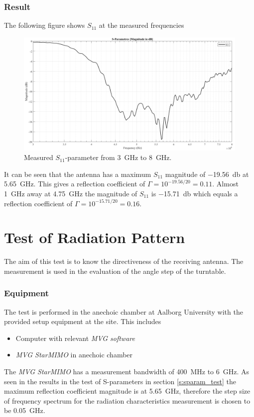 \subsubsection{Result}
The following figure shows $S_{11}$ at the measured frequencies
\begin{figure}[H]
    \centering
    \includegraphics[width=1\textwidth]{figures/s11_meas.png}
    \caption{Measured $S_{11}$-parameter from \SI{3}{\giga\hertz} to \SI{8}{\giga\hertz}.} \label{fig:s11_meas}
\end{figure}
It can be seen that the antenna has a maximum $S_{11}$ magnitude of \SI{-19.56}{\decibel} at \SI{5.65}{\giga\hertz}. This gives a reflection coefficient of $\Gamma = 10^{-19.56/20} = 0.11$. Almost \SI{1}{\giga\hertz} away at \SI{4.75}{\giga\hertz} the magnitude of $S_{11}$ is \SI{-15.71}{\decibel} which equals a reflection coefficient of $\Gamma = 10^{-15.71/20} = 0.16$.

\section{Test of Radiation Pattern} \label{s:rad_test}
The aim of this test is to know the directiveness of the receiving antenna. The measurement is used in the evaluation of the angle step of the turntable.

\subsubsection{Equipment}
The test is performed in the anechoic chamber at Aalborg University with the provided setup equipment at the site. This includes
\begin{itemize}
    \item Computer with relevant \textit{MVG software}
    \item \textit{MVG StarMIMO} in anechoic chamber
\end{itemize}
The \textit{MVG StarMIMO} has a measurement bandwidth of \SI{400}{\mega\hertz} to \SI{6}{\giga\hertz}. As seen in the results in the test of S-parameters in section \ref{s:sparam_test} the maximum reflection coefficient magnitude is at \SI{5.65}{\giga\hertz}, therefore the step size of frequency spectrum for the radiation characteristics measurement is chosen to be \SI{0.05}{\giga\hertz}.


